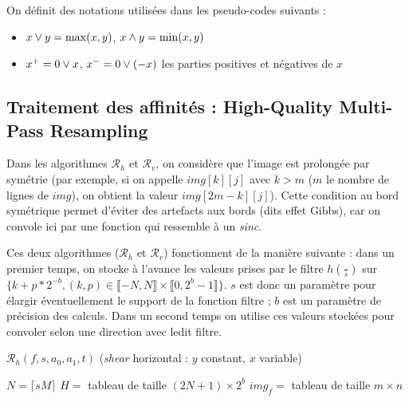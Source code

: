 
 On définit des notations utilisées dans les pseudo-codes suivants :
 \begin{itemize}
 \item $x \vee y = \max(x,y)$, $x \wedge y = \min(x,y)$
 \item $x^+ = 0 \vee x$, $x^- = 0 \vee (-x)$ les parties positives et négatives de $x$
 \end{itemize}
 
 \subsection*{Traitement des affinités : High-Quality Multi-Pass Resampling}
  
  Dans les algorithmes $\mathcal{R}_h$ et $\mathcal{R}_v$, on considère que l'image est prolongée par symétrie (par exemple, si on appelle $img[k][j]$ avec $k > m$ ($m$ le nombre de lignes de $img$), on obtient la valeur $img[2m-k][j]$). Cette condition au bord symétrique permet d'éviter des artefacts aux bords (dits effet Gibbs), car on convole ici par une fonction qui ressemble à un \emph{sinc}.
  
  Ces deux algorithmes ($\mathcal{R}_h$ et $\mathcal{R}_v$) fonctionnent de la manière suivante : dans un premier temps, on stocke à l'avance les valeurs prises par le filtre $h(\frac{\dot{}}{s})$ sur $\{k+p*2^{-b},(k,p)\in \llbracket -N,N \rrbracket \times \llbracket 0,2^b-1 \rrbracket\}$. $s$ est donc un paramètre pour élargir éventuellement le support de la fonction filtre ; $b$ est un paramètre de précision des calculs. Dans un second  temps on utilise ces valeurs stockées pour convoler selon une direction avec ledit filtre.
  
   \begin{algorithme}
    \caption{$\mathcal{R}_h(f,s,a_0,a_1,t)$ (\textit{shear} horizontal : $y$ constant, $x$ variable)}
    $N = \lceil sM \rceil$\;
    $H = $ tableau de taille $(2N+1) \times 2^b$\;
    $img_f = $ tableau de taille $m \times n$\;
   \end{algorithme}










